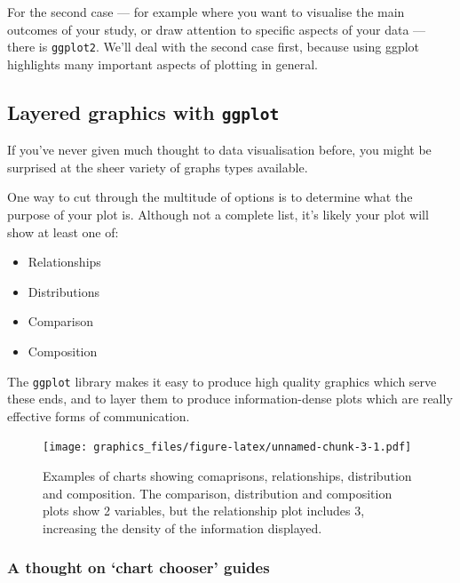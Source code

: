 \documentclass[]{article}
\providecommand{\tightlist}{%
  \setlength{\itemsep}{0pt}\setlength{\parskip}{0pt}}
\theoremstyle{definition}
\theoremstyle{definition}
\theoremstyle{definition}
\theoremstyle{remark}
\begin{document}
For the second case --- for example where you want to visualise the main
outcomes of your study, or draw attention to specific aspects of your
data --- there is \texttt{ggplot2}. We'll deal with the second case
first, because using ggplot highlights many important aspects of
plotting in general.

\hypertarget{layered-graphics}{\subsection*{\texorpdfstring{Layered
graphics with
\texttt{ggplot}}{Layered graphics with ggplot}}\label{layered-graphics}}

If you've never given much thought to data visualisation before, you
might be surprised at the sheer variety of graphs types available.

One way to cut through the multitude of options is to determine what the
purpose of your plot is. Although not a complete list, it's likely your
plot will show at least one of:

\begin{itemize}
\tightlist
\item
  Relationships
\item
  Distributions
\item
  Comparison
\item
  Composition
\end{itemize}

The \texttt{ggplot} library makes it easy to produce high quality
graphics which serve these ends, and to layer them to produce
information-dense plots which are really effective forms of
communication.

\begin{figure}
\centering
\texttt{[image: graphics\_files/figure-latex/unnamed-chunk-3-1.pdf]}
\caption{\label{fig:unnamed-chunk-3}Examples of charts showing comaprisons,
relationships, distribution and composition. The comparison,
distribution and composition plots show 2 variables, but the
relationship plot includes 3, increasing the density of the information
displayed.}
\end{figure}

\subsubsection*{\texorpdfstring{A thought on `chart chooser'
guides}{A thought on chart chooser guides}}\label{a-thought-on-chart-chooser-guides}
\end{document}
